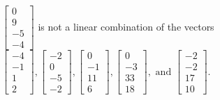 \begin{exercise}
\begin{exerciseStatement}
  \end{exerciseStatement}
  \begin{exerciseAnswer}
   \(\left[\begin{array}{c}
0 \\
9 \\
-5 \\
-4
\end{array}\right]\) 
  	 is not  
	a linear combination of the vectors \(\left[\begin{array}{c}
-4 \\
-1 \\
1 \\
2
\end{array}\right] , \left[\begin{array}{c}
-2 \\
0 \\
-5 \\
-2
\end{array}\right] , \left[\begin{array}{c}
0 \\
-1 \\
11 \\
6
\end{array}\right] , \left[\begin{array}{c}
0 \\
-3 \\
33 \\
18
\end{array}\right] , \text{ and } \left[\begin{array}{c}
-2 \\
-2 \\
17 \\
10
\end{array}\right]\).

	
  


  \end{exerciseAnswer}
\end{exercise}